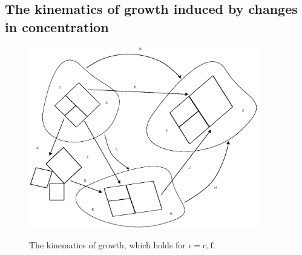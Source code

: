 \subsection{The kinematics of growth induced by changes in concentration}
\label{growthkinem}

\begin{figure}[ht]
  \centering
         {\includegraphics[width=10.00cm]{images/kinematics.eps}}
     \caption{The kinematics of growth, which holds for $\iota =
     \mathrm{c,f}$.} 
     \label{growthkine}
\end{figure}

